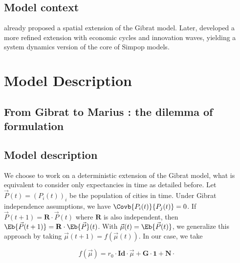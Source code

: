 \subsection{Model context}

\cite{bretagnolle2000long} already proposed a spatial extension of the Gibrat model. Later, \cite{favaro2011gibrat} developed a more refined extension with economic cycles and innovation waves, yielding a system dynamics version of the core of Simpop models.



\section{Model Description}

\subsection{From Gibrat to Marius : the dilemma of formulation}





\subsection{Model description}

We choose to work on a deterministic extension of the Gibrat model, what is equivalent to consider only expectancies in time as detailed before. Let $\vec{P}(t)=(P_i(t))_i$ be the population of cities in time. Under Gibrat independence assumptions, we have $\Covb{P_i(t)}{P_j(t)}=0$. If $\vec{P}(t+1)=\mathbf{R}\cdot \vec{P}(t)$ where $\mathbf{R}$ is also independent, then $\Eb{\vec{P}(t+1)}=\mathbf{R}\cdot\Eb{\vec{P}}(t)$. With $\vec{\mu}(t)=\Eb{\vec{P}(t)}$, we generalize this approach by taking $\vec{\mu}(t+1)=f(\vec{\mu}(t))$. In our case, we take

\[f(\vec{\mu}) = r_0\cdot \mathbf{Id}\cdot \vec{\mu} + \mathbf{G}\cdot \mathbf{1} + \mathbf{N}\cdot \]

